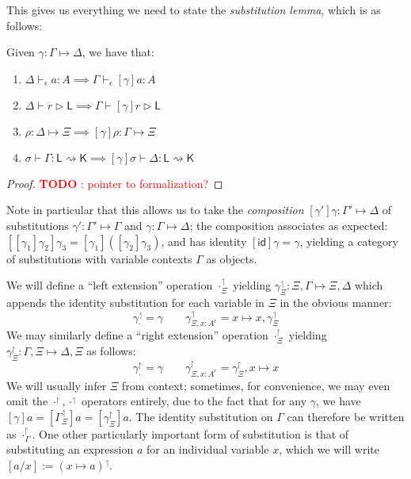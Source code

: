 \documentclass[acmsmall,screen,review]{acmart}
\newcounter{todos}
\newcommand{\todo}[1]{\stepcounter{todos} \textcolor{red}{\textbf{TODO \arabic{todos}}: #1}}
\newcommand{\ms}[1]{\ensuremath{\mathsf{#1}}}
\newcommand{\rupg}[1]{{#1}^\upharpoonright}
\newcommand{\lupg}[1]{{#1}^\upharpoonleft}
\newcommand{\thyp}[3]{#1 : {#2}^{#3}}
\newcommand{\hasty}[4]{#1 \vdash_{#2} #3: {#4}}
\newcommand{\haslb}[3]{#1 \vdash #2 \rhd #3}
\newcommand{\issubst}[3]{#1: #2 \mapsto #3}
\newcommand{\lbsubst}[4]{#1 \vdash #2: #3 \rightsquigarrow #4}
\begin{document}
This gives us everything we need to state the \emph{substitution lemma}, which
is as follows:
\begin{lemma}[Substitution]
  Given $\issubst{\gamma}{\Gamma}{\Delta}$, we have that:
  \begin{enumerate}[label=(\alph*)]
    \item $\hasty{\Delta}{\epsilon}{a}{A} \implies \hasty{\Gamma}{\epsilon}{[\gamma]a}{A}$ 
    \item $\haslb{\Delta}{r}{\ms{L}} \implies \haslb{\Gamma}{[\gamma]r}{\ms{L}}$
    \item $\issubst{\rho}{\Delta}{\Xi} \implies \issubst{[\gamma]\rho}{\Gamma}{\Xi}$
    \item $\lbsubst{\sigma}{\Gamma}{\ms{L}}{\ms{K}} \implies \lbsubst{[\gamma]\sigma}{\Delta}{\ms{L}}{\ms{K}}$
  \end{enumerate}
\end{lemma}
\begin{proof}
  \todo{pointer to formalization?}
\end{proof}
Note in particular that this allows us to take the \emph{composition}
$\issubst{[\gamma']\gamma}{\Gamma'}{\Delta}$ of substitutions $\issubst{\gamma'}{\Gamma'}{\Gamma}$
and $\issubst{\gamma}{\Gamma}{\Delta}$; the composition associates as expected:
$[[\gamma_1]\gamma_2]\gamma_3 = [\gamma_1]([\gamma_2]\gamma_3)$, and has identity $[\ms{id}]\gamma =
\gamma$, yielding a category of substitutions with variable contexts $\Gamma$ as objects.

We will define a ``left extension'' operation $\lupg{\cdot}_\Xi$ yielding
$\issubst{\lupg{\gamma}_{\Xi}}{\Xi, \Gamma}{\Xi, \Delta}$ which appends the identity substitution
for each variable in $\Xi$ in the obvious manner:
\begin{equation}
  \lupg{\gamma}_{\cdot} = \gamma \qquad 
  \lupg{\gamma}_{\Xi, \thyp{x}{A}{\epsilon}} = x \mapsto x, \lupg{\gamma}_{\Xi}
\end{equation}
We may similarly define a ``right extension'' operation $\rupg{\cdot}_\Xi$ yielding
$\issubst{\rupg{\gamma}_{\Xi}}{\Gamma, \Xi}{\Delta, \Xi}$ as follows:
\begin{equation}
  \rupg{\gamma}_{\cdot} = \gamma \qquad 
  \rupg{\gamma}_{\Xi, \thyp{x}{A}{\epsilon}} = \rupg{\gamma}_{\Xi}, x \mapsto x
\end{equation}
We will usually infer $\Xi$ from context; sometimes, for convenience, we may even omit the
$\rupg{\cdot}, \lupg{\cdot}$ operators entirely, due to the fact that for any $\gamma$, we have
$[\gamma]a = [\lupg{\Gamma}_\Xi]a = [\rupg{\gamma}_\Xi]a$. The identity substitution on $\Gamma$ can
therefore be written as $\rupg{\cdot}_{\Gamma}$. One other particularly important form of
substitution is that of substituting an expression $a$ for an individual variable $x$, which we will
write $[a/x] := \lupg{(x \mapsto a)}$.
\end{document}
